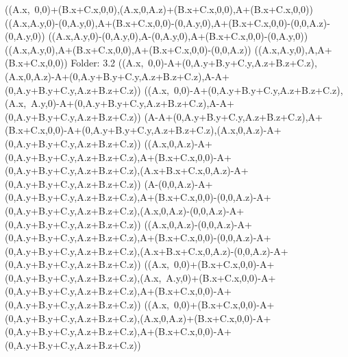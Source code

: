 \left(\left(A.x,\ 0,0\right)+\left(B.x+C.x,0,0\right),\left(A.x,0,A.z\right)+\left(B.x+C.x,0,0\right),A+\left(B.x+C.x,0,0\right)\right)
\left(\left(A.x,A.y,0\right)-\left(0,A.y,0\right),A+\left(B.x+C.x,0,0\right)-\left(0,A.y,0\right),A+\left(B.x+C.x,0,0\right)-\left(0,0,A.z\right)-\left(0,A.y,0\right)\right)
\left(\left(A.x,A.y,0\right)-\left(0,A.y,0\right),A-\left(0,A.y,0\right),A+\left(B.x+C.x,0,0\right)-\left(0,A.y,0\right)\right)
\left(\left(A.x,A.y,0\right),A+\left(B.x+C.x,0,0\right),A+\left(B.x+C.x,0,0\right)-\left(0,0,A.z\right)\right)
\left(\left(A.x,A.y,0\right),A,A+\left(B.x+C.x,0,0\right)\right)
Folder: 3.2
\left(\left(A.x,\ 0,0\right)-A+\left(0,A.y+B.y+C.y,A.z+B.z+C.z\right),\left(A.x,0,A.z\right)-A+\left(0,A.y+B.y+C.y,A.z+B.z+C.z\right),A-A+\left(0,A.y+B.y+C.y,A.z+B.z+C.z\right)\right)
\left(\left(A.x,\ 0,0\right)-A+\left(0,A.y+B.y+C.y,A.z+B.z+C.z\right),\left(A.x,\ A.y,0\right)-A+\left(0,A.y+B.y+C.y,A.z+B.z+C.z\right),A-A+\left(0,A.y+B.y+C.y,A.z+B.z+C.z\right)\right)
\left(A-A+\left(0,A.y+B.y+C.y,A.z+B.z+C.z\right),A+\left(B.x+C.x,0,0\right)-A+\left(0,A.y+B.y+C.y,A.z+B.z+C.z\right),\left(A.x,0,A.z\right)-A+\left(0,A.y+B.y+C.y,A.z+B.z+C.z\right)\right)
\left(\left(A.x,0,A.z\right)-A+\left(0,A.y+B.y+C.y,A.z+B.z+C.z\right),A+\left(B.x+C.x,0,0\right)-A+\left(0,A.y+B.y+C.y,A.z+B.z+C.z\right),\left(A.x+B.x+C.x,0,A.z\right)-A+\left(0,A.y+B.y+C.y,A.z+B.z+C.z\right)\right)
\left(A-\left(0,0,A.z\right)-A+\left(0,A.y+B.y+C.y,A.z+B.z+C.z\right),A+\left(B.x+C.x,0,0\right)-\left(0,0,A.z\right)-A+\left(0,A.y+B.y+C.y,A.z+B.z+C.z\right),\left(A.x,0,A.z\right)-\left(0,0,A.z\right)-A+\left(0,A.y+B.y+C.y,A.z+B.z+C.z\right)\right)
\left(\left(A.x,0,A.z\right)-\left(0,0,A.z\right)-A+\left(0,A.y+B.y+C.y,A.z+B.z+C.z\right),A+\left(B.x+C.x,0,0\right)-\left(0,0,A.z\right)-A+\left(0,A.y+B.y+C.y,A.z+B.z+C.z\right),\left(A.x+B.x+C.x,0,A.z\right)-\left(0,0,A.z\right)-A+\left(0,A.y+B.y+C.y,A.z+B.z+C.z\right)\right)
\left(\left(A.x,\ 0,0\right)+\left(B.x+C.x,0,0\right)-A+\left(0,A.y+B.y+C.y,A.z+B.z+C.z\right),\left(A.x,\ A.y,0\right)+\left(B.x+C.x,0,0\right)-A+\left(0,A.y+B.y+C.y,A.z+B.z+C.z\right),A+\left(B.x+C.x,0,0\right)-A+\left(0,A.y+B.y+C.y,A.z+B.z+C.z\right)\right)
\left(\left(A.x,\ 0,0\right)+\left(B.x+C.x,0,0\right)-A+\left(0,A.y+B.y+C.y,A.z+B.z+C.z\right),\left(A.x,0,A.z\right)+\left(B.x+C.x,0,0\right)-A+\left(0,A.y+B.y+C.y,A.z+B.z+C.z\right),A+\left(B.x+C.x,0,0\right)-A+\left(0,A.y+B.y+C.y,A.z+B.z+C.z\right)\right)
